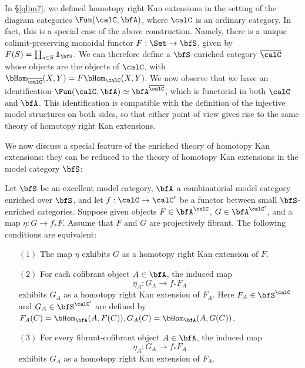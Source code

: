 \begin{Simplicial Categories}
\begin{remark}
In \S \ref{qlim7}, we defined homotopy right Kan extensions in the setting of
the diagram categories $\Fun( \calC, \bfA)$, where $\calC$ is an ordinary category.
In fact, this is a special case of the above construction. Namely, there is a unique colimit-preserving monoidal functor $F: \Set \rightarrow \bfS$, given by $F(S) = \coprod_{s \in S} {\bf 1}_{\bfS}$. We can therefore define a $\bfS$-enriched category $\overline{\calC}$ whose objects are the objects of $\calC$, with $\bHom_{ \overline{\calC} }(X,Y) = F \bHom_{\calC}(X,Y)$. We
now observe that we have an identification $\Fun( \calC, \bfA) \simeq \bfA^{\overline{\calC}}$, which is functorial in both $\calC$ and $\bfA$. This identification is compatible with the definition
of the injective model structures on both sides, so that either point of view gives rise to the same theory of homotopy right Kan extensions.
\end{remark}

We now discuss a special feature of the enriched theory of homotopy Kan extensions:
they can be reduced to the theory of homotopy Kan extensions in the model category $\bfS$:

\begin{proposition}\label{usecoinc}
Let $\bfS$ be an excellent model category, $\bfA$ a combinatorial model category
enriched over $\bfS$, and let $f: \calC \rightarrow \calC'$ be a functor between
small $\bfS$-enriched categories. Suppose
given objects $F \in \bfA^{\calC}$, $G \in \bfA^{\calC'}$, and a map $\eta: G \rightarrow f_{\ast} F$. 
Assume that $F$ and $G$ are projectively fibrant.
The following conditions are equivalent:

\begin{itemize}
\item[$(1)$]  The map $\eta$ exhibits $G$ as a homotopy right Kan extension of $F$.

\item[$(2)$] For each cofibrant object $A \in \bfA$, the induced map
$$ \eta_A: G_A \rightarrow f_{\ast} F_A$$
exhibits $G_A$ as a homotopy right Kan extension of $F_A$. Here $F_A \in \bfS^{\calC}$
and $G_A \in \bfS^{\calC'}$ are defined by $F_A(C) = \bHom_{\bfA}(A,F(C)), G_A(C) = \bHom_{\bfA}(A,G(C))$. 

\item[$(3)$] For every fibrant-cofibrant object $A \in \bfA$, the induced map
$$ \eta_A: G_A \rightarrow f_{\ast} F_A$$
exhibits $G_A$ as a homotopy right Kan extension of $F_A$.
\end{itemize}
\end{proposition}


\end{Simplicial Categories}
